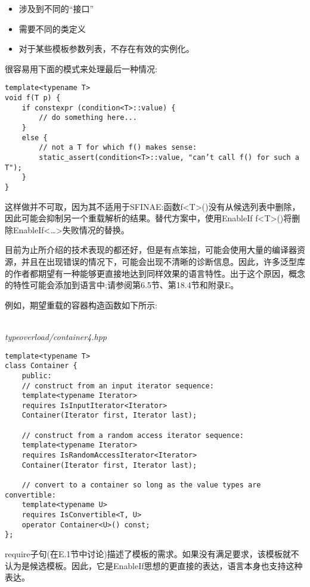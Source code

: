 \begin{itemize}
\item
涉及到不同的“接口”

\item
需要不同的类定义

\item
对于某些模板参数列表，不存在有效的实例化。
\end{itemize}

很容易用下面的模式来处理最后一种情况:

\begin{lstlisting}[style=styleCXX]
template<typename T>
void f(T p) {
	if constexpr (condition<T>::value) {
		// do something here...
	}
	else {
		// not a T for which f() makes sense:
		static_assert(condition<T>::value, "can’t call f() for such a T");
	}
}
\end{lstlisting}

这样做并不可取，因为其不适用于SFINAE:函数f<T>()没有从候选列表中删除，因此可能会抑制另一个重载解析的结果。替代方案中，使用EnableIf f<T>()将删除EnableIf<…>失败情况的替换。


目前为止所介绍的技术表现的都还好，但是有点笨拙，可能会使用大量的编译器资源，并且在出现错误的情况下，可能会出现不清晰的诊断信息。因此，许多泛型库的作者都期望有一种能够更直接地达到同样效果的语言特性。出于这个原因，概念的特性可能会添加到语言中;请参阅第6.5节、第18.4节和附录E。

例如，期望重载的容器构造函数如下所示:

\hspace*{\fill} \\ %
\noindent
\textit{typeoverload/container4.hpp}
\begin{lstlisting}[style=styleCXX]
template<typename T>
class Container {
	public:
	// construct from an input iterator sequence:
	template<typename Iterator>
	requires IsInputIterator<Iterator>
	Container(Iterator first, Iterator last);
	
	// construct from a random access iterator sequence:
	template<typename Iterator>
	requires IsRandomAccessIterator<Iterator>
	Container(Iterator first, Iterator last);
	
	// convert to a container so long as the value types are convertible:
	template<typename U>
	requires IsConvertible<T, U>
	operator Container<U>() const;
};
\end{lstlisting}

require子句(在E.1节中讨论)描述了模板的需求。如果没有满足要求，该模板就不认为是候选模板。因此，它是EnableIf思想的更直接的表达，语言本身也支持这种表达。


